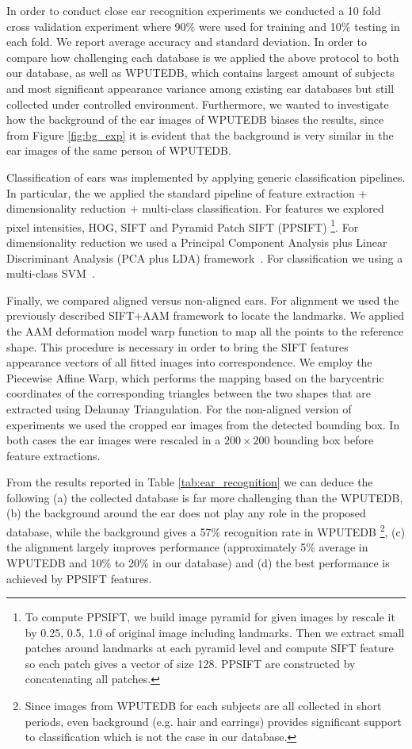 In order to conduct close ear recognition experiments we conducted a 10 fold cross validation experiment where 90$\%$ were used for training  and 10$\%$ testing in each fold. We report average accuracy and standard deviation. In order to compare how challenging each database is we applied the above protocol to both our database, as well as WPUTEDB, which contains largest amount of subjects and most significant appearance variance among existing ear databases but still collected under controlled environment. Furthermore, we wanted to investigate how the background of the ear images of WPUTEDB biases the results, since from Figure \ref{fig:bg_exp} it is evident that the background is very similar in the ear images of the same person of WPUTEDB.

Classification of ears was implemented by applying generic classification pipelines. In particular, the we applied the standard pipeline of feature extraction + dimensionality reduction + multi-class classification. For features we explored pixel intensities, HOG, SIFT and Pyramid Patch SIFT (PPSIFT) \footnote{To compute PPSIFT, we build image pyramid for given images by rescale it by 0.25, 0.5, 1.0 of original image including landmarks. Then we extract small patches around landmarks at each pyramid level and compute SIFT feature so each patch gives a vector of size 128. PPSIFT are constructed by concatenating all patches.}. For dimensionality reduction we used a Principal Component Analysis plus Linear Discriminant Analysis (PCA plus LDA) framework~\cite{belhumeur1997eigenfaces}. For classification we using a multi-class SVM~\cite{hsu2002comparison}.


Finally, we compared aligned versus non-aligned ears. For alignment we used the previously described SIFT+AAM framework to locate the landmarks. We applied the AAM deformation model warp function to map all the points to the reference shape. This procedure is necessary in order to bring the SIFT features appearance vectors of all fitted images into correspondence. We employ the Piecewise Affine Warp, which performs the mapping based on the barycentric coordinates of the corresponding triangles between the two shapes that are extracted using Delaunay Triangulation. For the non-aligned version of experiments we used the cropped ear images from the detected bounding box. In both cases the ear images were rescaled in a $200 \times 200$ bounding box before feature extractions. 

From the results reported in Table \ref{tab:ear_recognition} we can deduce the following (a) the collected database is far more challenging than the WPUTEDB, (b) the background around the ear does not play any role in the proposed database, while the background gives a 57$\%$ recognition rate in WPUTEDB \footnote{Since images from WPUTEDB for each subjects are all collected in short periods, even background (e.g. hair and earrings) provides significant support to classification which is not the case in our database.}, (c) the alignment largely improves performance (approximately 5\% average in WPUTEDB and 10\% to 20\% in our database) and (d) the best performance is achieved by PPSIFT features. 

